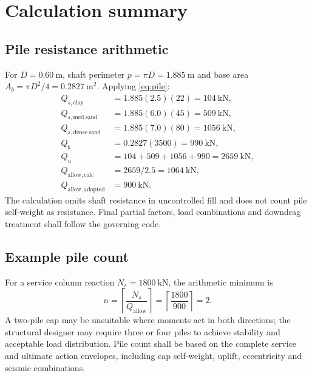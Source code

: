 \section{Calculation summary}
\subsection{Pile resistance arithmetic}
For $D=\SI{0.60}{\metre}$, shaft perimeter $p=\pi D=\SI{1.885}{\metre}$ and base area
$A_b=\pi D^2/4=\SI{0.2827}{\metre\squared}$. Applying \cref{eq:pile}:
\begin{align*}
Q_{s,\mathrm{clay}} &= 1.885(2.5)(22) = \SI{104}{\kilo\newton},\\
Q_{s,\mathrm{med\ sand}} &= 1.885(6.0)(45) = \SI{509}{\kilo\newton},\\
Q_{s,\mathrm{dense\ sand}} &= 1.885(7.0)(80) = \SI{1056}{\kilo\newton},\\
Q_b &= 0.2827(3500) = \SI{990}{\kilo\newton},\\
Q_u &= 104+509+1056+990 = \SI{2659}{\kilo\newton},\\
Q_{\mathrm{allow,calc}} &= 2659/2.5 = \SI{1064}{\kilo\newton},\\
Q_{\mathrm{allow,adopted}} &= \SI{900}{\kilo\newton}.
\end{align*}
The calculation omits shaft resistance in uncontrolled fill and does not count pile self-weight
as resistance. Final partial factors, load combinations and downdrag treatment shall follow the
governing code.

\subsection{Example pile count}
For a service column reaction $N_s=\SI{1800}{\kilo\newton}$, the arithmetic minimum is
\begin{equation*}
n=\left\lceil\frac{N_s}{Q_{\mathrm{allow}}}\right\rceil
=\left\lceil\frac{1800}{900}\right\rceil=2.
\end{equation*}
A two-pile cap may be unsuitable where moments act in both directions; the structural designer
may require three or four piles to achieve stability and acceptable load distribution. Pile count
shall be based on the complete service and ultimate action envelopes, including cap self-weight,
uplift, eccentricity and seismic combinations.
